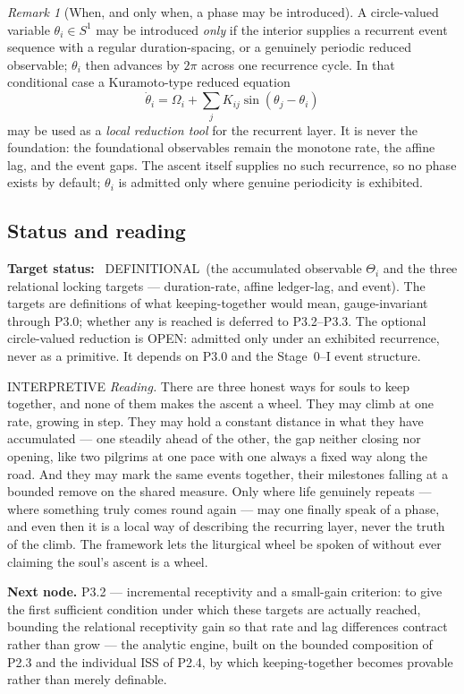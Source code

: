 \documentclass[11pt,a4paper]{article}
\newcommand{\stDef}{\textcolor{cDef}{\textsf{\small DEFINITIONAL}}}
\newcommand{\stInterp}{\textcolor{cInt}{\textsf{\small INTERPRETIVE}}}
\newcommand{\stOpen}{\textcolor{cOpn}{\textsf{\small OPEN}}}
\theoremstyle{definition}
\theoremstyle{plain}
\theoremstyle{remark}
\newtheorem{remark}[definition]{Remark}
\begin{document}
\begin{remark}[When, and only when, a phase may be introduced]\label{rem:s1}
A circle-valued variable \(\theta_i\in S^1\) may be introduced \emph{only} if the interior
supplies a recurrent event sequence with a regular duration-spacing, or a genuinely
periodic reduced observable; \(\theta_i\) then advances by \(2\pi\) across one recurrence
cycle. In that conditional case a Kuramoto-type reduced equation
\[
\dot\theta_i=\Omega_i+\sum_{j}K_{ij}\sin(\theta_j-\theta_i)
\]
may be used as a \emph{local reduction tool} for the recurrent layer. It is never the
foundation: the foundational observables remain the monotone rate, the affine lag, and the
event gaps. The ascent itself supplies no such recurrence, so no phase exists by default;
\(\theta_i\) is admitted only where genuine periodicity is exhibited.
\end{remark}

\subsection{Status and reading}

\textbf{Target status:}~
\stDef\ (the accumulated observable \(\Theta_i\) and the three relational locking
targets --- duration-rate, affine ledger-lag, and event). The targets are
definitions of what keeping-together would mean, gauge-invariant through P3.0;
whether any is reached is deferred to P3.2--P3.3. The optional circle-valued
reduction is \stOpen: admitted only under an exhibited recurrence, never as a
primitive. It depends on P3.0 and the Stage~0--I event structure.

\medskip
\stInterp\quad
\emph{Reading.}
There are three honest ways for souls to keep together, and none of them makes the ascent a
wheel. They may climb at one rate, growing in step. They may hold a constant distance in
what they have accumulated --- one steadily ahead of the other, the gap neither closing nor
opening, like two pilgrims at one pace with one always a fixed way along the road. And they
may mark the same events together, their milestones falling at a bounded remove on the
shared measure. Only where life genuinely repeats --- where something truly comes round
again --- may one finally speak of a phase, and even then it is a local way of describing the
recurring layer, never the truth of the climb. The framework lets the liturgical wheel be
spoken of without ever claiming the soul's ascent is a wheel.

\medskip
\textbf{Next node.} P3.2 --- incremental receptivity and a small-gain criterion: to give the
first sufficient condition under which these targets are actually reached, bounding the
relational receptivity gain so that rate and lag differences contract rather than grow ---
the analytic engine, built on the bounded composition of P2.3 and the individual ISS of
P2.4, by which keeping-together becomes provable rather than merely definable.
\end{document}

